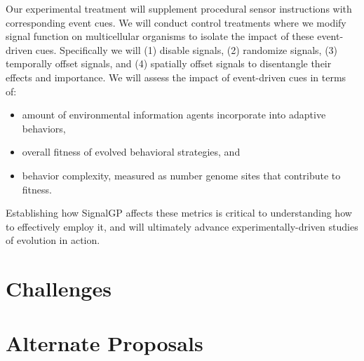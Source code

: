 Our experimental treatment will supplement procedural sensor instructions with corresponding event cues.
We will conduct control treatments where we modify signal function on multicellular organisms to isolate the impact of these event-driven cues.  Specifically we will (1) disable signals, (2) randomize signals, (3) temporally offset signals, and (4) spatially offset signals to disentangle their effects and importance.
We will assess the impact of event-driven cues in terms of:
\begin{itemize}
\item amount of environmental information agents incorporate into adaptive behaviors,
\item overall fitness of evolved behavioral strategies, and
\item behavior complexity, measured as number genome sites that contribute to fitness.
\end{itemize}

Establishing how SignalGP affects these metrics is critical to understanding how to effectively employ it, and will ultimately advance experimentally-driven studies of evolution in action.

\section{Challenges}








\section{Alternate Proposals}

